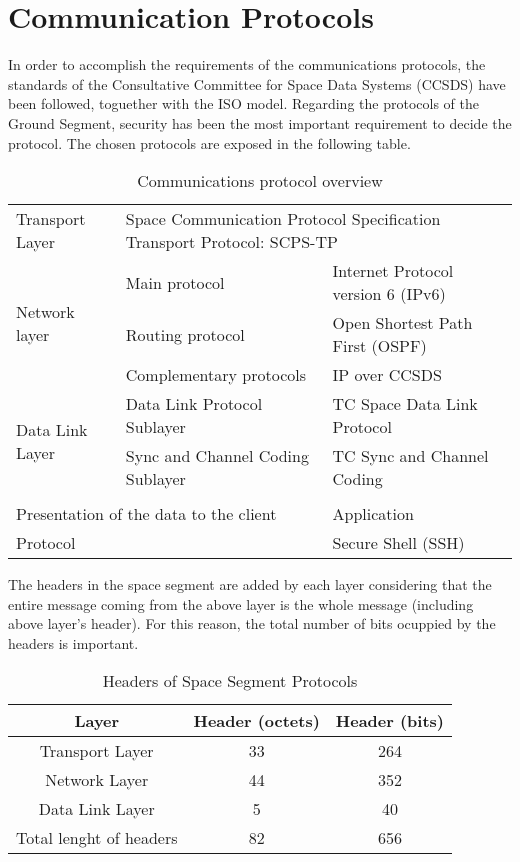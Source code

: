 \chapter{Communication Protocols}
In order to accomplish the requirements of the communications protocols, the standards of the Consultative Committee for Space Data Systems (CCSDS) have been followed, toguether with the ISO model. Regarding the protocols of the Ground Segment, security has been the most important requirement to decide the protocol. The chosen protocols are exposed in the following table.
\begin{table}[H]
\begin{center}
\begin{tabular}{|l|l|l|}
\hline
\rowcolor[gray]{0.80} \multicolumn{3}{|c|}{\textbf{Space segment: CCSDS Standards}}\\
\hline
Transport Layer&\multicolumn{2}{|l|}{Space Communication Protocol Specification Transport Protocol: SCPS-TP}\\
\hline
\multirow{3}{*}{Network layer}&Main protocol&Internet Protocol version 6 (IPv6)\\
&Routing protocol&Open Shortest Path First (OSPF)\\
&Complementary protocols&IP over CCSDS\\
\hline
\multirow{2}{*}{Data Link Layer}&Data Link Protocol Sublayer&TC Space Data Link Protocol\\
&Sync and Channel Coding Sublayer&TC Sync and Channel Coding\\
\hline
\rowcolor[gray]{0.80} \multicolumn{3}{|c|}{\textbf{Ground segment}}\\
\hline
\multicolumn{2}{|l|}{Presentation of the data to the client}&Application\\
\hline
\multicolumn{2}{|l|}{Protocol}&Secure Shell (SSH)\\
\hline
\end{tabular}
\caption{Communications protocol overview}
\end{center}
\end{table}
The headers in the space segment are added by each layer considering that the entire message coming from the above layer is the whole message (including above layer's header). For this reason, the total number of bits ocuppied by the headers is important. 
\begin{table}[H]
\begin{center}
\begin{tabular}{|c|c|c|}
\hline
\rowcolor[gray]{0.80}\textbf{Layer}&\textbf{Header (octets)}&\textbf{Header (bits)}\\
\hline
Transport Layer&33&264\\
\hline
Network Layer&44&352\\
\hline
Data Link Layer&5&40\\
\hline
\cellcolor[gray]{0.85}Total lenght of headers&82&656\\
\hline
\end{tabular}
\caption{Headers of Space Segment Protocols}
\end{center}
\end{table}
